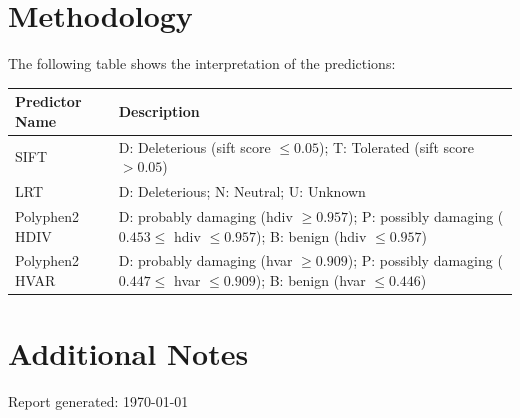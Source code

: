 \documentclass[10pt]{article}
\begin{document}
\section*{Methodology}
\noindent {}
\bigskip
\noindent The following table shows the interpretation of the predictions:
\newline
\footnotesize
\def\arraystretch{1.5}
\begin{tabular}{|l|p{5.75in}|}
  \hline
  \textbf{Predictor Name} & \textbf{Description} \\ \hline
  SIFT & D: Deleterious (sift score $\leq 0.05$); T: Tolerated (sift score $> 0.05$) \\ \hline
  LRT & D: Deleterious; N: Neutral; U: Unknown \\ \hline
  Polyphen2 HDIV & D: probably damaging (hdiv $\geq 0.957$); P: possibly damaging ($0.453 \leq$ hdiv $\leq 0.957$); B: benign (hdiv $\leq 0.957$) \\ \hline
  Polyphen2 HVAR & D: probably damaging (hvar $\geq 0.909$); P: possibly damaging ($0.447 \leq$ hvar $\leq 0.909$); B: benign (hvar $\leq 0.446$) \\ \hline
\end{tabular}
\normalsize

\bigskip

\section*{Additional Notes}
\noindent {}
\bigskip
\newline \noindent Report generated: \today
\end{document}
